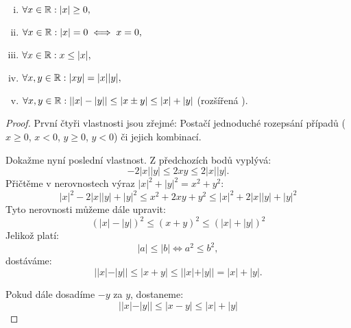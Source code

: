 \begin{theorem}
    \label{th:triangleineq}
    \leavevmode
    \begin{enumerate}[i.]
        \item $\forall x \in \mathbb{R}: |x| \geq 0,$
        \item $\forall x \in \mathbb{R}: |x| = 0 \iff x = 0,$
        \item $\forall x \in \mathbb{R}: x \leq |x|,$
        \item $\forall x,y \in \mathbb{R}: |xy| = |x||y|,$
        \item $\forall x,y \in \mathbb{R}: ||x| - |y|| \leq |x \pm y| \leq |x| + 
            |y|$ (rozšířená ).
    \end{enumerate}
\end{theorem}

\begin{proof}
    První čtyři vlastnosti jsou zřejmé: Postačí jednoduché rozepsání případů 
    ($x \geq 0$, $x < 0$, $y \geq 0$, $y < 0$) či jejich kombinací.

    Dokažme nyní poslední vlastnost. Z předchozích bodů vyplývá:
    $$-2|x||y| \leq 2xy \leq 2|x||y|.$$
    Přičtěme v nerovnostech výraz $|x|^2 + |y|^2 = x^2 + y^2$:
    $$|x|^2 - 2|x||y| + |y|^2 \leq x^2 + 2xy + y^2 \leq |x|^2 + 2|x||y| + |y|^2$$
    Tyto nerovnosti můžeme dále upravit:
    $$ (|x| - |y|)^2 \leq (x + y)^2 \leq (|x|+|y|)^2$$
    Jelikož platí:
    $$|a| \leq |b| \iff a^2 \leq b^2,$$
    dostáváme:
    $$ ||x| - |y|| \leq |x + y| \leq ||x| + |y|| = |x| + |y|.$$

    Pokud dále dosadíme $-y$ za $y$, dostaneme:
    $$||x| - |y|| \leq |x - y| \leq |x| + |y|$$
\end{proof}
